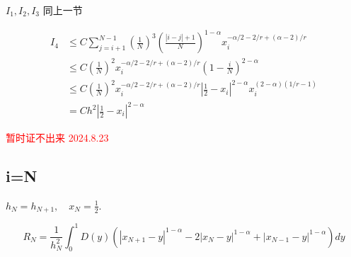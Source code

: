 \documentclass{ctexart}
\begin{document}
\(I_1, I_2, I_3\) 同上一节

\begin{equation}
    \begin{aligned}
        I_4 &\le C \sum_{j=i+1}^{N-1} \left(\frac{1}{N}\right)^3 \left(\frac{|i-j|+1}{N}\right)^{1-\alpha} x_i^{-\alpha/2-2/r+(\alpha-2)/r}   \\
        & \le C  \left(\frac{1}{N}\right)^2 x_i^{-\alpha/2-2/r+(\alpha-2)/r} \left(1-\frac{i}{N}\right)^{2-\alpha}   \\
        &\le C \left(\frac{1}{N}\right)^2 x_i^{-\alpha/2-2/r+(\alpha-2)/r} |\frac{1}{2}-x_i|^{2-\alpha} x_i^{(2-\alpha)(1/r-1)}   \\
        & = C h^2 |\frac{1}{2}-x_i|^{2-\alpha}
    \end{aligned}
\end{equation}

\textcolor{red}{暂时证不出来 2024.8.23}

\newpage
\subsection{i=N}

\(h_N = h_{N+1}, \quad x_N = \frac{1}{2}\).

\begin{equation}
    R_N = \frac{1}{h_{N}^2} \int_0^1 D(y)  
    (  |x_{N+1}-y|^{1-\alpha} - 2|x_{N}-y|^{1-\alpha} + |x_{N-1}-y|^{1-\alpha} )  dy 
\end{equation}
\end{document}
